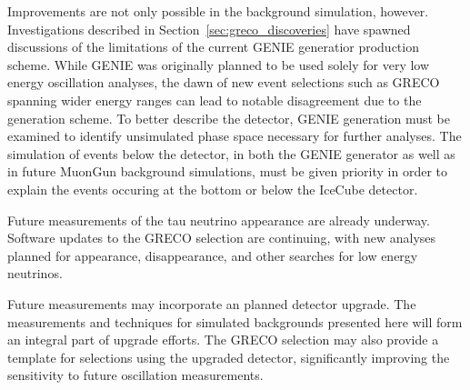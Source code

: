 Improvements are not only possible in the background simulation, however.
Investigations described in Section~\ref{sec:greco_discoveries} have spawned discussions of the limitations of the current GENIE generatior production scheme.
While GENIE was originally planned to be used solely for very low energy oscillation analyses, the dawn of new event selections such as GRECO spanning wider energy ranges can lead to notable disagreement due to the generation scheme.
To better describe the detector, GENIE generation must be examined to identify unsimulated phase space necessary for further analyses.
The simulation of events below the detector, in both the GENIE generator as well as in future MuonGun background simulations, must be given priority in order to explain the events occuring at the bottom or below the IceCube detector.

Future measurements of the tau neutrino appearance are already underway.
Software updates to the GRECO selection are continuing, with new analyses planned for appearance, disappearance, and other searches for low energy neutrinos.

Future measurements may incorporate an planned detector upgrade.
The measurements and techniques for simulated backgrounds presented here will form an integral part of upgrade efforts.
The GRECO selection may also provide a template for selections using the upgraded detector, significantly improving the sensitivity to future oscillation measurements.




